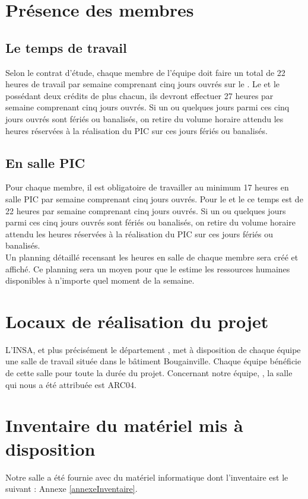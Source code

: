 \section{Présence des membres}
\label{Présence des membres}

\subsection{Le temps de travail}
\label{temps_de_travail}
Selon le contrat d'étude, chaque membre de l'équipe doit faire un total de 22 heures de travail par semaine comprenant cinq jours ouvrés sur le \PICCourt. Le \CP{} et le \RQ{} possédant deux crédits de plus chacun, ils devront effectuer 27 heures par semaine comprenant cinq jours ouvrés. Si un ou quelques jours parmi ces cinq jours ouvrés sont fériés ou banalisés, on retire du volume horaire attendu les heures réservées à la réalisation du PIC sur ces jours fériés ou banalisés.

\subsection{En salle PIC}
\label{en_salle_pic}
Pour chaque membre, il est obligatoire de travailler au minimum 17 heures en salle PIC par semaine comprenant cinq jours ouvrés. Pour le \CP{} et le \RQ{} ce temps est de 22 heures par semaine comprenant cinq jours ouvrés. Si un ou quelques jours parmi ces cinq jours ouvrés sont fériés ou banalisés, on retire du volume horaire attendu les heures réservées à la réalisation du PIC sur ces jours fériés ou banalisés.\\

Un planning détaillé recensant les heures en salle de chaque membre sera créé et affiché.
Ce planning sera un moyen pour que le \CP{} estime les ressources humaines disponibles à n'importe quel moment de la semaine.

\section{Locaux de réalisation du projet}
\label{Locaux de réalisation du projet}
\indent L'INSA, et plus précisément le département \ASI{}, met à disposition de chaque équipe une salle de travail située dans le bâtiment Bougainville. Chaque équipe \PIC{} bénéficie de cette salle pour toute la durée du projet.
Concernant notre équipe, \nomEquipe, la salle qui nous a été attribuée est ARC04.

\section{Inventaire du matériel mis à disposition}
\label{Inventaire du matériel mis à disposition}
Notre salle \PICCourt a été fournie avec du matériel informatique dont l'inventaire est le suivant : Annexe \ref{annexeInventaire}.

